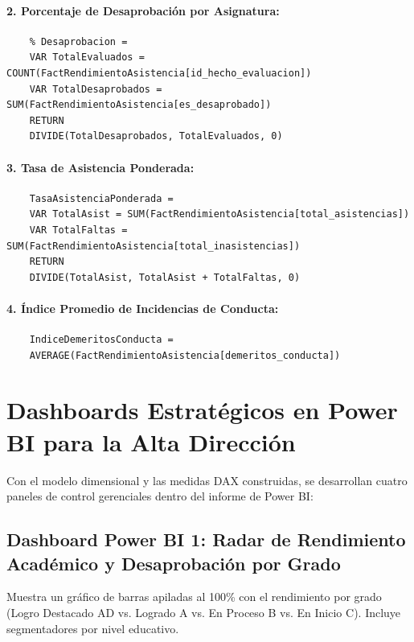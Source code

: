 \documentclass[12pt,a4paper,oneside]{report}
\begin{document}
    \paragraph{2. Porcentaje de Desaprobación por Asignatura:}
    \begin{lstlisting}
    % Desaprobacion = 
    VAR TotalEvaluados = COUNT(FactRendimientoAsistencia[id_hecho_evaluacion])
    VAR TotalDesaprobados = SUM(FactRendimientoAsistencia[es_desaprobado])
    RETURN
    DIVIDE(TotalDesaprobados, TotalEvaluados, 0)
    \end{lstlisting}

    \paragraph{3. Tasa de Asistencia Ponderada:}
    \begin{lstlisting}
    TasaAsistenciaPonderada = 
    VAR TotalAsist = SUM(FactRendimientoAsistencia[total_asistencias])
    VAR TotalFaltas = SUM(FactRendimientoAsistencia[total_inasistencias])
    RETURN
    DIVIDE(TotalAsist, TotalAsist + TotalFaltas, 0)
    \end{lstlisting}

    \paragraph{4. Índice Promedio de Incidencias de Conducta:}
    \begin{lstlisting}
    IndiceDemeritosConducta = 
    AVERAGE(FactRendimientoAsistencia[demeritos_conducta])
    \end{lstlisting}

    \section{Dashboards Estratégicos en Power BI para la Alta Dirección}

    Con el modelo dimensional y las medidas DAX construidas, se desarrollan cuatro paneles de control gerenciales dentro del informe de Power BI:

    \subsection{Dashboard Power BI 1: Radar de Rendimiento Académico y Desaprobación por Grado}
    Muestra un gráfico de barras apiladas al 100\% con el rendimiento por grado (Logro Destacado AD vs. Logrado A vs. En Proceso B vs. En Inicio C). Incluye segmentadores por nivel educativo.
\end{document}
